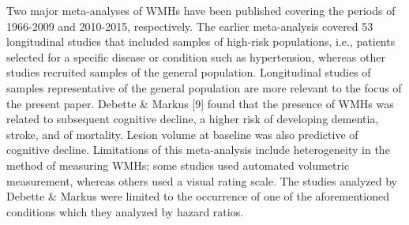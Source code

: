 \documentclass[11pt,]{article}
\begin{document}
Two major meta-analyses of WMHs have been published covering the periods
of 1966-2009 and 2010-2015, respectively. The earlier meta-analysis
covered 53 longitudinal studies that included samples of high-risk
populations, i.e., patients selected for a specific disease or condition
such as hypertension, whereas other studies recruited samples of the
general population. Longitudinal studies of samples representative of
the general population are more relevant to the focus of the present
paper. Debette \& Markus {[}9{]} found that the presence of WMHs was
related to subsequent cognitive decline, a higher risk of developing
dementia, stroke, and of mortality. Lesion volume at baseline was also
predictive of cognitive decline. Limitations of this meta-analysis
include heterogeneity in the method of measuring WMHs; some studies used
automated volumetric measurement, whereas others used a visual rating
scale. The studies analyzed by Debette \& Markus were limited to the
occurrence of one of the aforementioned conditions which they analyzed
by hazard ratios.
\end{document}
